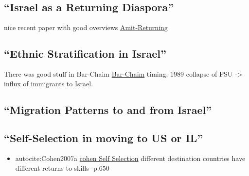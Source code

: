 \documentclass[12pt,twoside]{reedthesis}
\providecommand{\tightlist}{%
  \setlength{\itemsep}{0pt}\setlength{\parskip}{0pt}}
\begin{document}
  \subsection{\texorpdfstring{``Israel as a Returning
  Diaspora''}{Israel as a Returning Diaspora}}\label{israel-as-a-returning-diaspora}
  
  nice recent paper with good overviews
  \href{file:///Users/AbuDavid/Documents/ThesisDocs/Amit,\%20Semyonov/2006/Amit,\%20Semyonov\%20-\%20Metropolis\%20world\%20bulletin\%20-\%202006.pdf}{Amit-Returning}
  
  \subsection{\texorpdfstring{``Ethnic Stratification in
  Israel''}{Ethnic Stratification in Israel}}\label{ethnic-stratification-in-israel}
  
  There was good stuff in Bar-Chaim
  \href{file:///Users/AbuDavid/Documents/ThesisDocs/Bar-haim,\%20Semyonov/2015/Bar-haim,\%20Semyonov\%20-\%20The\%20International\%20Handbook\%20of\%20the\%20Demography\%20of\%20Race\%20and\%20Ethnicity\%20-\%202015.pdf}{Bar-Chaim}
  timing: 1989 collapse of FSU -\textgreater{} influx of immigrants to
  Israel.
  
  \subsection{\texorpdfstring{``Migration Patterns to and from
  Israel''}{Migration Patterns to and from Israel}}\label{migration-patterns-to-and-from-israel}
  
  \subsection{\texorpdfstring{``Self-Selection in moving to US or
  IL''}{Self-Selection in moving to US or IL}}\label{self-selection-in-moving-to-us-or-il}
  
  \begin{itemize}
  \tightlist
  \item
    autocite:Cohen2007a
    \href{file:///Users/AbuDavid/Documents/ThesisDocs/Cohen,\%20Haberfeld/2007/Cohen,\%20Haberfeld\%20-\%20SELF-SELECTION\%20AND\%20EARNINGS\%20ASSIMILATION\%20IMMIGRANTS\%20FROM\%20THE\%20FORMER\%20SOVIET\%20UNION\%20IN\%20ISRAEL\%20AND\%20THE\%20UNITED\%20STATES\%20-\%2020.pdf}{cohen
    Self Selection} different destination countries have different returns
    to skills -p.650
  \end{itemize}
  
\end{document}
